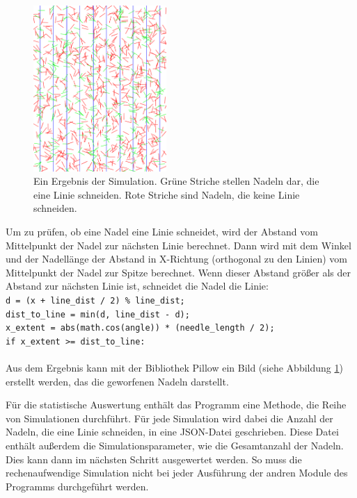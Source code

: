 \documentclass[10pt,twocolumn]{scrartcl}
\begin{document}
		\begin{figure}[htb]
			\centering
			\includegraphics[width=0.45\textwidth]{images/needels.png}
			\caption{Ein Ergebnis der Simulation. Grüne Striche stellen Nadeln dar, die eine Linie schneiden. Rote Striche sind Nadeln, die keine Linie schneiden.}
			\label{fig:needels}
		\end{figure}

		Um zu prüfen, ob eine Nadel eine Linie schneidet, wird der Abstand vom Mittelpunkt der Nadel zur nächsten Linie berechnet. Dann wird mit dem Winkel und der Nadellänge der Abstand in X-Richtung (orthogonal zu den Linien) vom Mittelpunkt der Nadel zur Spitze berechnet. Wenn dieser Abstand größer als der Abstand zur nächsten Linie ist, schneidet die Nadel die Linie:\\
		\texttt{d = (x + line\_dist / 2) \% line\_dist;\\
			dist\_to\_line = min(d, line\_dist - d);\\
			x\_extent = abs(math.cos(angle)) * (needle\_length / 2);\\
			if x\_extent >= dist\_to\_line:}\\
		\\
		Aus dem Ergebnis kann mit der Bibliothek Pillow\cite{Pillow} ein Bild (siehe Abbildung \ref{fig:needels}) erstellt werden, das die geworfenen Nadeln darstellt.

		Für die statistische Auswertung enthält das Programm eine Methode, die Reihe von Simulationen durchführt. Für jede Simulation wird dabei die Anzahl der Nadeln, die eine Linie schneiden, in eine JSON-Datei geschrieben. Diese Datei enthält außerdem die Simulationsparameter, wie die Gesamtanzahl der Nadeln. Dies kann dann im nächsten Schritt ausgewertet werden. So muss die rechenaufwendige Simulation nicht bei jeder Ausführung der andren Module des Programms durchgeführt werden.
\end{document}
